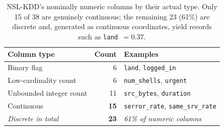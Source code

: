 \begin{table}[t]
\centering
\caption{NSL-KDD's nominally numeric columns by their actual type. Only 15 of 38 are genuinely continuous; the remaining 23 (61\%) are discrete and, generated as continuous coordinates, yield records such as \texttt{land}~$=0.37$.}
\label{tab:feattypes}
\begin{tabular}{lrl}
\toprule
Column type & Count & Examples \\
\midrule
Binary flag & {6} & \texttt{land}, \texttt{logged\_in} \\
Low-cardinality count & {6} & \texttt{num\_shells}, \texttt{urgent} \\
Unbounded integer count & {11} & \texttt{src\_bytes}, \texttt{duration} \\
Continuous & \textbf{15} & \texttt{serror\_rate}, \texttt{same\_srv\_rate} \\
\midrule
\emph{Discrete in total} & \textbf{23} & \emph{61\% of numeric columns} \\
\bottomrule
\end{tabular}
\end{table}
